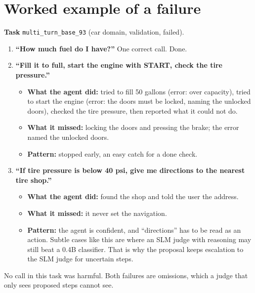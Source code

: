 \documentclass[10.5pt,a4paper]{article}
\newcommand{\code}[1]{\texttt{#1}}
\begin{document}
\section{Worked example of a failure}
\textbf{Task} \code{multi\_turn\_base\_93} (car domain, validation, failed).
\begin{enumerate}[leftmargin=16pt]
  \item \textbf{``How much fuel do I have?''} One correct call. Done.
  \item \textbf{``Fill it to full, start the engine with START, check the tire pressure.''}
  \begin{itemize}
    \item \textbf{What the agent did:} tried to fill 50 gallons (error: over capacity), tried to start the engine (error: the doors must be locked, naming the unlocked doors), checked the tire pressure, then reported what it could not do.
    \item \textbf{What it missed:} locking the doors and pressing the brake; the error named the unlocked doors.
    \item \textbf{Pattern:} stopped early, an easy catch for a done check.
  \end{itemize}
  \item \textbf{``If tire pressure is below 40 psi, give me directions to the nearest tire shop.''}
  \begin{itemize}
    \item \textbf{What the agent did:} found the shop and told the user the address.
    \item \textbf{What it missed:} it never set the navigation.
    \item \textbf{Pattern:} the agent is confident, and ``directions'' has to be read as an action. Subtle cases like this are where an SLM judge with reasoning may still beat a 0.4B classifier. That is why the proposal keeps escalation to the SLM judge for uncertain steps.
  \end{itemize}
\end{enumerate}
No call in this task was harmful. Both failures are omissions, which a judge that only sees proposed steps cannot see.

\end{document}
